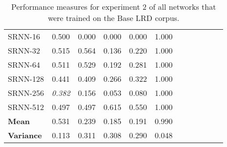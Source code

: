 \begin{table}
\begin{tabularx}{\textwidth}{@{}l*{10}{C}c@{}}
  SRNN-16 &     0.500 &      0.000 &   0.000 &     0.000 &    1.000 \\
  SRNN-32 &     0.515 &      0.564 &   0.136 &     0.220 &    1.000 \\
  SRNN-64 &     0.511 &      0.529 &   0.192 &     0.281 &    1.000 \\
 SRNN-128 &     0.441 &      0.409 &   0.266 &     0.322 &    1.000 \\
 SRNN-256 &     \textit{0.382} &      0.156 &   0.053 &     0.080 &    1.000 \\
 SRNN-512 &     0.497 &      0.497 &   0.615 &     0.550 &    1.000 \\
 \midrule
 \midrule
 \textbf{Mean} & 0.531 & 0.239 & 0.185 & 0.191 & 0.990 \\
 \textbf{Variance} & 0.113 & 0.311 & 0.308 & 0.290 & 0.048 \\
\bottomrule
\end{tabularx}
\caption[Base LRD trained network performance on experiment 2]{Performance measures for experiment 2 of all networks that were trained on the Base LRD corpus.}
\label{tab:perf_NDbase}
\end{table}